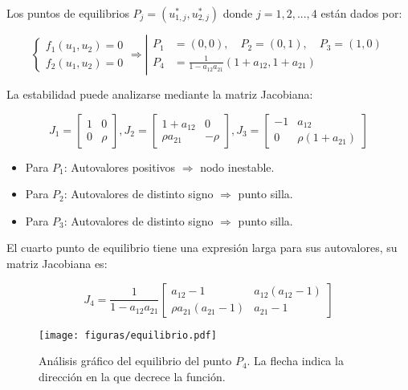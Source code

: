 \documentclass[twocolumn,aps,prl]{revtex4-1}
\begin{document}
Los puntos de equilibrios $P_j = (u^*_{1,j},u^*_{2,j})$ donde $j= 1, 2, ..., 4$ están dados por: 

$$
\left\{
\begin{aligned}
    f_1(u_1, u_2) = 0\\ 
    f_2(u_1, u_2) = 0
\end{aligned} \right. \Rightarrow
\left\lvert 
\begin{aligned}
    P_1 &= (0, 0), \quad P_2 = (0, 1), \quad P_3 = (1, 0) \\ 
    P_4 &= \frac{1}{1-a_{12} a_{21}}(1+a_{12}, 1+a_{21})
\end{aligned} \right.
$$

La estabilidad puede analizarse mediante la matriz Jacobiana:

$$
J_1 = \begin{bmatrix}
    1 & 0 \\
    0 & \rho 
\end{bmatrix}
,
J_2 = \begin{bmatrix}
    1 + a_{12} & 0 \\
     \rho a_{21} & - \rho 
\end{bmatrix}
,
J_3 = \begin{bmatrix}
    -1 & a_{12} \\
    0      & \rho \left( 1 + a_{21} \right)
\end{bmatrix}
$$

\begin{itemize}
    \item Para $P_1$: Autovalores positivos $\Rightarrow$ nodo inestable.
    \item Para $P_2$: Autovalores de distinto signo $\Rightarrow$ punto silla.
    \item Para $P_3$: Autovalores de distinto signo $\Rightarrow$ punto silla.
\end{itemize}

El cuarto punto de equilibrio tiene una expresión larga para sus autovalores, su matriz Jacobiana es:

$$
J_4 = 
\frac{1}{1-a_{12} a_{21}}
\begin{bmatrix}
    a_{12} - 1 & a_{12} (a_{12} - 1) \\
    \rho a_{21} (a_{21} - 1) & a_{21} - 1
\end{bmatrix}
$$


\begin{figure}
    \centering
    \texttt{[image: figuras/equilibrio.pdf]}
    \caption{Análisis gráfico del equilibrio del punto $P_4$. La flecha indica la dirección en la que decrece la función.}
    \label{fig:mosquitos}
\end{figure}
\end{document}

